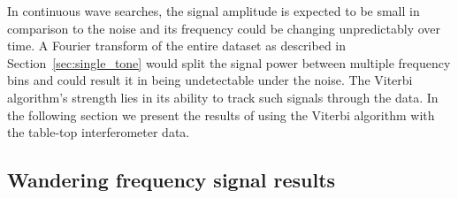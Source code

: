 \documentclass[paper-main.tex]{subfiles}
\begin{document}
In continuous wave searches, the signal amplitude is expected to be small in comparison to the noise and its frequency could be changing unpredictably over time.
A Fourier transform of the entire dataset as described in Section~\ref{sec:single_tone} would split the signal power between multiple frequency bins and could result it in being undetectable under the noise. 
The Viterbi algorithm's strength lies in its ability to track such signals through the data.
In the following section we present the results of using the Viterbi algorithm with the table-top interferometer data. 








\subsection{Wandering frequency signal results}
\label{sec:wanderingResults}
\end{document}
